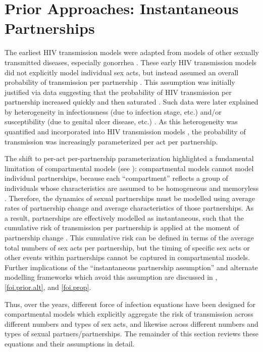 \section{Prior Approaches: Instantaneous Partnerships}\label{foi.prior}
The earliest HIV transmission models \cite{Anderson1986}
were adapted from models of other sexually transmitted diseases,
especially gonorrhea \cite{Yorke1978,Nold1980,Hethcote1982}.
These early HIV transmission models did not explicitly model individual sex acts,
but instead assumed an overall probability of transmission per partnership \cite{Isham1988}.
This assumption was initially justified via data suggesting that
the probability of HIV transmission per partnership
increased quickly and then saturated \cite{Kaplan1990}.
Such data were later explained by heterogeneity in
infectiousness (\eg due to infection stage, etc.) and/or
susceptibility (\eg due to genital ulcer disease, etc.)
\cite{Gray2001,Rottingen2002,Boily2009}.
As this heterogeneity was quantified \cite{Gray2001}
and incorporated into HIV transmission models \cite{Moghadas2003},
the probability of transmission was increasingly parameterized per act \vs per partnership.
\par
The shift to per-act \vs per-partnership parameterization highlighted
a fundamental limitation of compartmental models (see ):
compartmental models cannot model individual partnerships,
because each ``compartment'' reflects a group of individuals
whose characteristics are assumed to be homogeneous and memoryless \cite{Rao2021}.
Therefore, the dynamics of sexual partnerships must be modelled using
average rates of partnership change and average characteristics of those partnerships.
As a result, partnerships are effectively modelled as instantaneous, such that
the cumulative risk of transmission per partnership
is applied at the moment of partnership change \cite{Dietz1988a}.
This cumulative risk can be defined in terms of
the average total numbers of sex acts per partnership,
but the timing of specific sex acts or other events within partnerships
cannot be captured in compartmental models.
Further implications of the ``instantaneous partnership assumption''
and alternate modelling frameworks which avoid this assumption
are discussed in , \ref{foi.prior.alt}, and \ref{foi.prop}.
\par
Thus, over the years, different force of infection equations
have been designed for compartmental models which
explicitly aggregate the risk of transmission across different numbers and types of sex acts,
and likewise across different numbers and types of sexual partners/partnerships.
The remainder of this section reviews these equations and their assumptions in detail.
